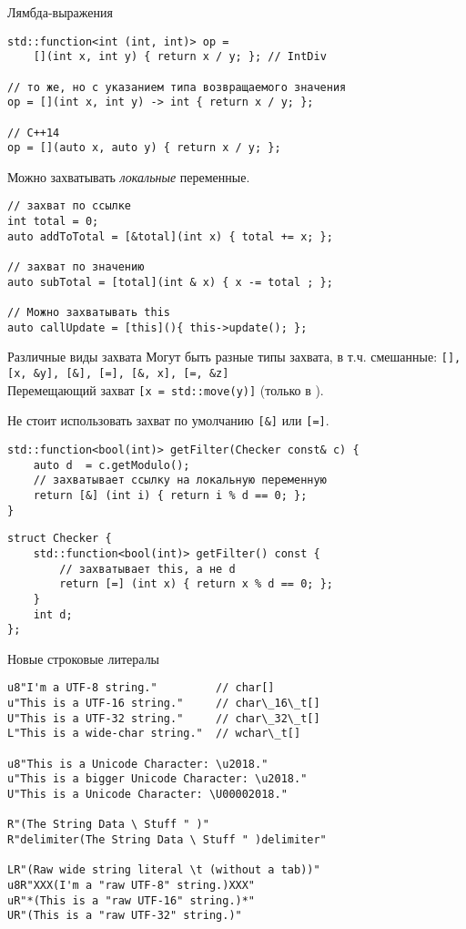 \documentclass[aspectration=1610,t]{beamer}
\begin{document}
\begin{frame}[fragile]{Лямбда-выражения}
\begin{lstlisting}
std::function<int (int, int)> op = 
    [](int x, int y) { return x / y; }; // IntDiv

// то же, но с указанием типа возвращаемого значения
op = [](int x, int y) -> int { return x / y; };

// С++14
op = [](auto x, auto y) { return x / y; }; 
\end{lstlisting}

Можно захватывать \emph{локальные} переменные.
\begin{lstlisting}
// захват по ссылке
int total = 0;
auto addToTotal = [&total](int x) { total += x; };

// захват по значению
auto subTotal = [total](int & x) { x -= total ; };

// Можно захватывать this
auto callUpdate = [this](){ this->update(); };
\end{lstlisting}
\end{frame}

\begin{frame}[fragile]{Различные виды захвата}
Могут быть разные типы захвата, в т.ч. смешанные: 
\verb![], [x, &y], [&], [=], [&, x], [=, &z]!\\
\medskip
Перемещающий захват \verb![x = std::move(y)]! (только в \langcpp[14]).
\medskip

Не стоит использовать захват по умолчанию \verb![&]! или \verb![=]!.
\begin{lstlisting}
std::function<bool(int)> getFilter(Checker const& c) {
    auto d  = c.getModulo();
    // захватывает ссылку на локальную переменную
    return [&] (int i) { return i % d == 0; };
}
\end{lstlisting}

\begin{lstlisting}
struct Checker {
    std::function<bool(int)> getFilter() const {
        // захватывает this, а не d
        return [=] (int x) { return x % d == 0; };
    }
    int d;
};
\end{lstlisting}
\end{frame}

\begin{frame}[fragile]{Новые строковые литералы}
\begin{lstlisting}
u8"I'm a UTF-8 string."         // char[]
u"This is a UTF-16 string."     // char\_16\_t[]
U"This is a UTF-32 string."     // char\_32\_t[]
L"This is a wide-char string."  // wchar\_t[]

u8"This is a Unicode Character: \u2018."
u"This is a bigger Unicode Character: \u2018."
U"This is a Unicode Character: \U00002018."

R"(The String Data \ Stuff " )"
R"delimiter(The String Data \ Stuff " )delimiter"

LR"(Raw wide string literal \t (without a tab))"
u8R"XXX(I'm a "raw UTF-8" string.)XXX"
uR"*(This is a "raw UTF-16" string.)*"
UR"(This is a "raw UTF-32" string.)"
\end{lstlisting}
\end{frame}
\end{document}
